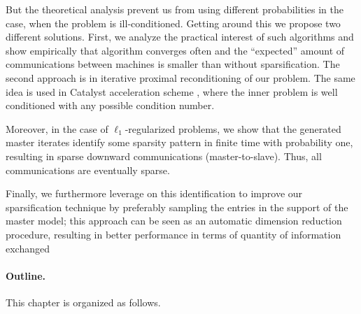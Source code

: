 {But the theoretical analysis prevent us from using different probabilities in the case, when the problem is ill-conditioned. Getting around this we propose two different solutions. First, we analyze the practical interest of such algorithms and show empirically that algorithm converges often and the ``expected'' amount of communications between machines is smaller than without sparsification. The second approach is in iterative proximal reconditioning of our problem. The same idea is used in Catalyst acceleration scheme \cite{lin2015universal}, where the inner problem is well conditioned with any possible condition number.

Moreover, in the case of $\ell_1$-regularized problems, we show that the generated master iterates identify some sparsity pattern in finite time with probability one, resulting in sparse downward communications (master-to-slave). Thus, all communications are eventually sparse. 

Finally, we furthermore leverage on this identification to improve our sparsification technique by preferably sampling the entries in the support of the master model; 
this approach can be seen as an automatic dimension reduction procedure, resulting in better performance in terms of quantity of information exchanged {\color{red}{that is proven to be better than non-sparsified algorithm in terms of communications with specific probability for coordinates outside the support.}}
\paragraph{Outline.}
This chapter is organized as follows.
}


